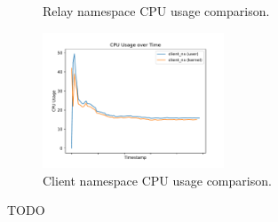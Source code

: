 \begin{figure}[!htb]
\begin{minipage}{0.48\textwidth}
        \caption[Relay CPU usage comparison]{Relay namespace CPU usage comparison.}\label{fig:cpu-utilization-relay}
    \end{minipage}\hfill
    \begin{minipage}{\textwidth}
        \centering
        \includegraphics[width=0.48\textwidth]{figures/04_testing_and_results/cpu_usage_client_ns.pdf}
        \caption[Client CPU usage comparison]{Client namespace CPU usage comparison.}\label{fig:cpu-utilization-client}
    \end{minipage}
\end{figure}

TODO